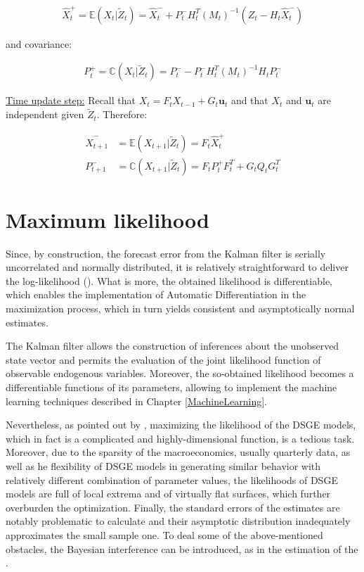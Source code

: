 \documentclass{pracamgr}
\numberwithin{equation}{section}
\begin{document}
\begin{align}
\hat{X}_{t}^{+} = \mathbb{E} (X_{t} | \tilde{Z}_{t} ) = \hat{X}_{t}^{-} + P_{t}^{-} H_{t}^{T} \left(M_{t} \right)^{-1} \left(Z_{t} - H_{t} \hat{X}_{t}^{-} \right)
\end{align}

and covariance:

\begin{align}
P_{t}^{+} = \mathbb{C} (X_{t} | \tilde{Z}_{t} ) = P_{t}^{-} - P_{t}^{-} H_{t}^{T}\left(M_{t} \right)^{-1} H_{t} P_{t}^{-}
\end{align}

\underline{Time update step:} Recall that $X_{t} = F_{t} X_{t-1} + G_{t} \mathbf{u}_{t}$ and that $X_{t}$ and $ \mathbf{u}_{t}$ are independent given $\tilde{Z}_{t}$. Therefore:

\begin{align}
\hat{X}_{t+1}^{-} &= \mathbb{E} (X_{t+1} | \tilde{Z}_{t} ) = F_{t} \hat{X}_{t}^{+} \\
P_{t+1}^{-} &= \mathbb{C} (X_{t+1} | \tilde{Z}_{t} ) = F_{t} P_{t}^{+} F_{t}^{T} + G_{t}Q_{t}G_{t}^{T}
\end{align} 

\section{Maximum likelihood}

Since, by construction, the forecast error from the Kalman filter is serially uncorrelated and normally distributed, it is relatively straightforward to deliver the log-likelihood (\citet{ireland2004method}). What is more, the obtained likelihood is differentiable, which enables the implementation of Automatic Differentiation in the maximization process, which in turn yields consistent and asymptotically normal estimates.

The Kalman filter allows the construction of inferences about the unobserved state vector and permits the evaluation of the joint likelihood function of observable endogenous variables. Moreover, the so-obtained likelihood becomes a differentiable functions of its parameters, allowing to implement the machine learning techniques described in Chapter \ref{MachineLearning}.

Nevertheless, as pointed out by \citet{fernandez2010econometrics}, maximizing the likelihood of the DSGE models, which in fact is a complicated and highly-dimensional function, is a tedious task. Moreover, due to the sparsity of the macroeconomics, usually quarterly data, as well as he flexibility of DSGE models in generating similar behavior with relatively different combination of parameter values, the likelihoods of DSGE models are full of local extrema and of virtually flat surfaces, which further overburden the optimization. Finally, the standard errors of the estimates are notably problematic to calculate and their asymptotic distribution inadequately approximates the small sample one. To deal some of the above-mentioned obstacles, the Bayesian interference can be introduced, as in the estimation of the \citet{smets2003estimated}.
\end{document}
